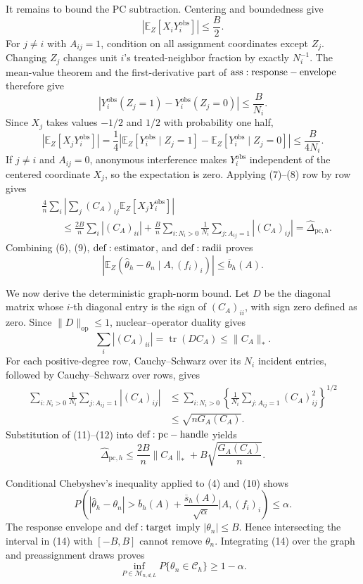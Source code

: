 It remains to bound the PC subtraction.  Centering and boundedness give
\[
 \left|\mathbb E_Z[X_iY_i^{\mathrm{obs}}]\right|
 \leq\frac B2.
\tag{7}
\]
For \(j\ne i\) with \(A_{ij}=1\), condition on all assignment coordinates except \(Z_j\).  Changing \(Z_j\) changes unit \(i\)'s treated-neighbor fraction by exactly \(N_i^{-1}\).  The mean-value theorem and the first-derivative part of \({\rm ass:response-envelope}\) therefore give
\[
 |Y_i^{\mathrm{obs}}(Z_j=1)-Y_i^{\mathrm{obs}}(Z_j=0)|
 \leq\frac B{N_i}.
\]
Since \(X_j\) takes values \(-1/2\) and \(1/2\) with probability one half,
\[
 \left|\mathbb E_Z[X_jY_i^{\mathrm{obs}}]\right|
 =\frac14\left|
  \mathbb E_Z[Y_i^{\mathrm{obs}}\mid Z_j=1]
 -\mathbb E_Z[Y_i^{\mathrm{obs}}\mid Z_j=0]
 \right|
 \leq\frac B{4N_i}.
\tag{8}
\]
If \(j\ne i\) and \(A_{ij}=0\), anonymous interference makes \(Y_i^{\mathrm{obs}}\) independent of the centered coordinate \(X_j\), so the expectation is zero.  Applying (7)--(8) row by row gives
\[
\begin{aligned}
 &\frac4n\sum_i\left|
   \sum_j(C_A)_{ij}\mathbb E_Z[X_jY_i^{\mathrm{obs}}]
  \right|\\
 &\qquad\leq
 \frac{2B}{n}\sum_i|(C_A)_{ii}|
 +\frac Bn\sum_{i:N_i>0}\frac1{N_i}
      \sum_{j:A_{ij}=1}|(C_A)_{ij}|
 =\widehat\Delta_{\mathrm{pc},h}.
\end{aligned}
\tag{9}
\]
Combining (6), (9), \({\rm def:estimator}\), and \({\rm def:radii}\) proves
\[
 \left|\mathbb E_Z(\widehat\theta_h-\theta_n\mid A,(f_i)_i)\right|
 \leq\overline b_h(A).
\tag{10}
\]

We now derive the deterministic graph-norm bound.  Let \(D\) be the diagonal matrix whose \(i\)-th diagonal entry is the sign of \((C_A)_{ii}\), with sign zero defined as zero.  Since \(\|D\|_{\mathrm{op}}\leq1\), nuclear--operator duality gives
\[
 \sum_i|(C_A)_{ii}|=\operatorname{tr}(DC_A)
 \leq\|C_A\|_*.
\tag{11}
\]
For each positive-degree row, Cauchy--Schwarz over its \(N_i\) incident entries, followed by Cauchy--Schwarz over rows, gives
\[
\begin{aligned}
 \sum_{i:N_i>0}\frac1{N_i}
    \sum_{j:A_{ij}=1}|(C_A)_{ij}|
 &\leq\sum_{i:N_i>0}
  \left\{\frac1{N_i}\sum_{j:A_{ij}=1}(C_A)_{ij}^2\right\}^{1/2}\\
 &\leq\sqrt{nG_A(C_A)}.
\end{aligned}
\tag{12}
\]
Substitution of (11)--(12) into \({\rm def:pc-handle}\) yields
\[
 \widehat\Delta_{\mathrm{pc},h}
 \leq\frac{2B}{n}\|C_A\|_*
 +B\sqrt{\frac{G_A(C_A)}n}.
\tag{13}
\]

Conditional Chebyshev's inequality applied to (4) and (10) shows
\[
 P\!\left(
 |\widehat\theta_h-\theta_n|>
 \overline b_h(A)+\frac{\overline s_h(A)}{\sqrt\alpha}
 \mathrel{\Big|}A,(f_i)_i
 \right)\leq\alpha.
\tag{14}
\]
The response envelope and \({\rm def:target}\) imply \(|\theta_n|\leq B\).  Hence intersecting the interval in (14) with \([-B,B]\) cannot remove \(\theta_n\).  Integrating (14) over the graph and preassignment draws proves
\[
 \inf_{P\in\mathcal M_{n,d,L}}P\{\theta_n\in\mathcal C_h\}\geq1-\alpha.
\tag{15}
\]

